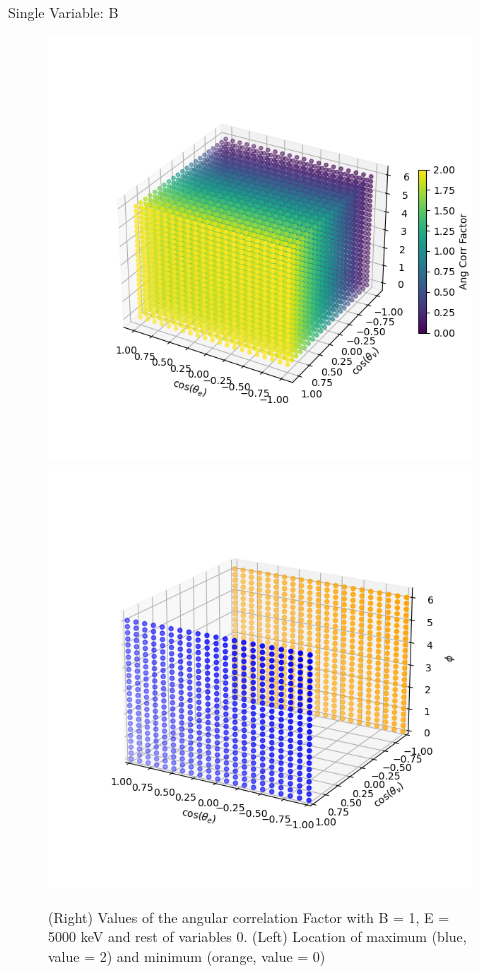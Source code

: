 \documentclass{beamer}
\begin{document}
\begin{frame}{Single Variable: B}
	\begin{figure}
		\centering
		\includegraphics[width=0.4\paperwidth]{plots/B_3D_image.png}
		\includegraphics[width=0.4\paperwidth]{plots/B_max_min.png}
		\caption{(Right) Values of the angular correlation Factor with B = 1, E = 5000 keV and rest of variables 0. (Left) Location of maximum (blue, value = 2) and minimum (orange, value = 0)}
	\end{figure}
\end{frame}
\end{document}
